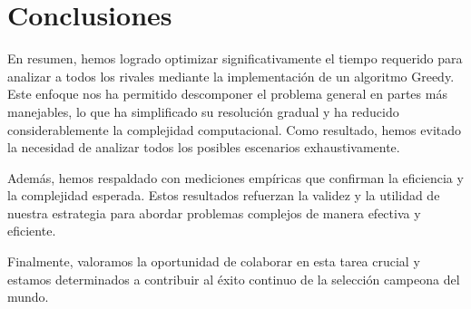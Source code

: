 \section{Conclusiones}


En resumen, hemos logrado optimizar significativamente el tiempo requerido para analizar a todos los rivales mediante la implementación de un algoritmo Greedy. Este enfoque nos ha permitido descomponer el problema general en partes más manejables, lo que ha simplificado su resolución gradual y ha reducido considerablemente la complejidad computacional. Como resultado, hemos evitado la necesidad de analizar todos los posibles escenarios exhaustivamente.

Además, hemos respaldado con mediciones empíricas que confirman la eficiencia y la complejidad esperada. Estos resultados refuerzan la validez y la utilidad de nuestra estrategia para abordar problemas complejos de manera efectiva y eficiente.


Finalmente, valoramos la oportunidad de colaborar en esta tarea crucial y estamos determinados a contribuir al éxito continuo de la selección campeona del mundo.



